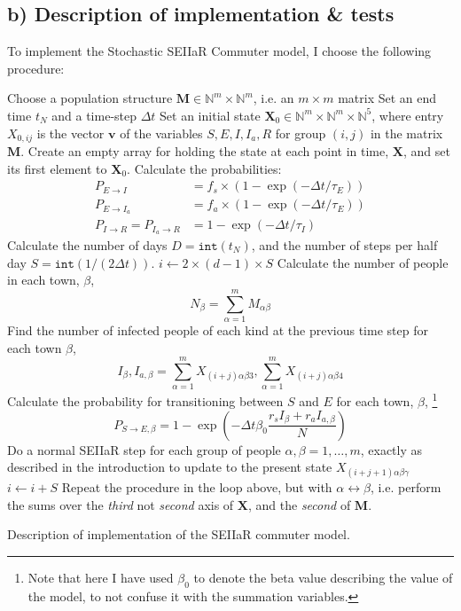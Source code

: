 \subsection{b) Description of implementation \& tests} 

To implement the Stochastic SEIIaR Commuter model, I choose the following procedure: 

\begin{algorithm}[H]\label{alg:commuter}
	Choose a population structure $\mathbf{M} \in \mathbb{N}^m \times \mathbb{N}^m$, i.e. an $m\times m$ matrix\;  
	Set an end time $t_N$ and a time-step $\Delta t$\;
	Set an initial state $\mathbf{X}_0 \in \mathbb{N}^m \times \mathbb{N}^m \times \mathbb{N}^5$, where entry $X_{0,ij}$ is the vector $\mathbf{v}$ of the variables $S,E,I,I_a,R$ for group $(i,j)$ in the matrix $\mathbf{M}$.\;
	Create an empty array for holding the state at each point in time, $\mathbf{X}$, and set its first element to $\mathbf{X}_0$.\;
	Calculate the probabilities:
	\begin{align*}
		P_{E\to I} &= f_s \times (1 - \exp{(-\Delta t/\tau_E)}) \\
		P_{E\to I_a} &= f_a \times (1 - \exp{(-\Delta t/\tau_E)}) \\
		P_{I\to R} = P_{I_a\to R} &= 1 - \exp{(-\Delta t/\tau_I)} 
	\end{align*}
	Calculate the number of days $D = \texttt{int}(t_N)$, and the number of steps per half day $S = \texttt{int}(1/(2\Delta t))$.\; 
		{
		$i \gets 2 \times (d-1) \times S$\;
			{
			Calculate the number of people in each town, $\beta$,
				$$
				N_\beta = \sum_{\alpha = 1}^{m} M_{\alpha \beta} 
				$$ 
			Find the number of infected people of each kind at the previous time step for each town $\beta$,
				$$
				I_{\beta}, I_{a,\beta} = \sum_{\alpha = 1}^{m} X_{(i+j)\alpha\beta3},  \sum_{\alpha = 1}^{m} X_{(i+j)\alpha\beta4} 
				$$
			Calculate the probability for transitioning between $S$ and $E$ for each town, $\beta$, \footnote{Note that here I have used $\beta_0$ to denote the beta value describing the value of the model, to not confuse it with the summation variables.}
				$$
				P_{S\to E,\beta} = 1 - \exp{\left( - \Delta t \beta_0 \frac{r_s I_{\beta} + r_a I_{a,\beta}}{N}\right)} 
				$$
			}
			Do a normal SEIIaR step for each group of people $\alpha,\beta=1,\dots,m$, exactly as described in the introduction to update to the present state $X_{(i+j+1)\alpha\beta\gamma}$\;   
		$i \gets i + S$\;
			{
			Repeat the procedure in the loop above, but with $\alpha \leftrightarrow \beta$, i.e. perform the sums over the \textit{third} not \textit{second} axis of $\mathbf{X}$, and the \textit{second} of $\mathbf{M}$. \;
			}
		}
		\caption{Description of implementation of the SEIIaR commuter model.}
\end{algorithm} 

